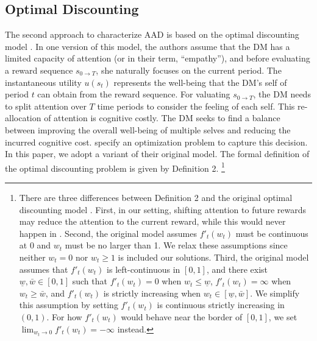 \documentclass[
  12pt,
]{article}
\begin{document}
\hypertarget{optimal-discounting}{%
\subsection{\texorpdfstring{Optimal Discounting
\label{optimal_discount}}{Optimal Discounting }}\label{optimal-discounting}}

The second approach to characterize AAD is based on the optimal
discounting model \citep{noor2022optimal,noor2024constrained}. In one
version of this model, the authors assume that the DM has a limited
capacity of attention (or in their term, ``empathy''), and before
evaluating a reward sequence \(s_{0\rightarrow T}\), she naturally
focuses on the current period. The instantaneous utility \(u(s_t)\)
represents the well-being that the DM's self of period \(t\) can obtain
from the reward sequence. For valuating \(s_{0\rightarrow T}\), the DM
needs to split attention over \(T\) time periods to consider the feeling
of each self. This re-allocation of attention is cognitive costly. The
DM seeks to find a balance between improving the overall well-being of
multiple selves and reducing the incurred cognitive cost.
\citet{noor2022optimal,noor2024constrained} specify an optimization
problem to capture this decision. In this paper, we adopt a variant of
their original model. The formal definition of the optimal discounting
problem is given by Definition 2. \footnote{There are three differences
  between Definition 2 and the original optimal discounting model
  \citep{noor2022optimal,noor2024constrained}. First, in our setting,
  shifting attention to future rewards may reduce the attention to the
  current reward, while this would never happen in
  \citet{noor2022optimal,noor2024constrained}. Second, the original
  model assumes \(f'_t(w_t)\) must be continuous at 0 and \(w_t\) must
  be no larger than 1. We relax these assumptions since neither
  \(w_t=0\) nor \(w_t\geq1\) is included our solutions. Third, the
  original model assumes that \(f'_t(w_t)\) is left-continuous in
  \([0,1]\), and there exist \(\underline{w},\bar{w}\in[0,1]\) such that
  \(f'_t(w_t)=0\) when \(w_t\leq\underline{w}\), \(f'_t(w_t)=\infty\)
  when \(w_t\geq\bar{w}\), and \(f'_t(w_t)\) is strictly increasing when
  \(w_t \in [\underline{w},\bar{w}]\). We simplify this assumption by
  setting \(f'_t(w_t)\) is continuous strictly increasing in \((0,1)\).
  For how \(f'_t(w_t)\) would behave near the border of \([0,1]\), we
  set \(\lim_{w_t\rightarrow 0} f'_t(w_t)=-\infty\) instead.}
\end{document}
